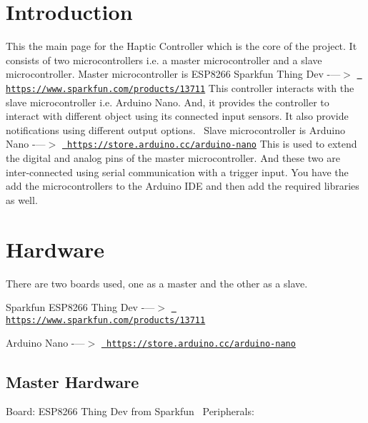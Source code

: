 \hypertarget{index_intro_sec}{}\section{Introduction}\label{index_intro_sec}
This the main page for the Haptic Controller which is the core of the project. It consists of two microcontrollers i.\+e. a master microcontroller and a slave microcontroller. Master microcontroller is E\+S\+P8266 Sparkfun Thing Dev -\/---$>$ \href{https://www.sparkfun.com/products/13711}{\texttt{ https\+://www.\+sparkfun.\+com/products/13711}} This controller interacts with the slave microcontroller i.\+e. Arduino Nano. And, it provides the controller to interact with different object using its connected input sensors. It also provide notifications using different output options.~\newline
Slave microcontroller is Arduino Nano -\/---$>$ \href{https://store.arduino.cc/arduino-nano}{\texttt{ https\+://store.\+arduino.\+cc/arduino-\/nano}} This is used to extend the digital and analog pins of the master microcontroller. And these two are inter-\/connected using serial communication with a trigger input. You have the add the microcontrollers to the Arduino I\+DE and then add the required libraries as well. \hypertarget{index_hw_sec}{}\section{Hardware}\label{index_hw_sec}
There are two boards used, one as a master and the other as a slave.~\newline

\begin{DoxyEnumerate}
\item Sparkfun E\+S\+P8266 Thing Dev -\/---$>$ \href{https://www.sparkfun.com/products/13711}{\texttt{ https\+://www.\+sparkfun.\+com/products/13711}}
\item Arduino Nano -\/---$>$ \href{https://store.arduino.cc/arduino-nano}{\texttt{ https\+://store.\+arduino.\+cc/arduino-\/nano}} 
\end{DoxyEnumerate}\hypertarget{index_hw_sec1}{}\subsection{Master Hardware}\label{index_hw_sec1}
Board\+: E\+S\+P8266 Thing Dev from Sparkfun~\newline
Peripherals\+:~\newline


